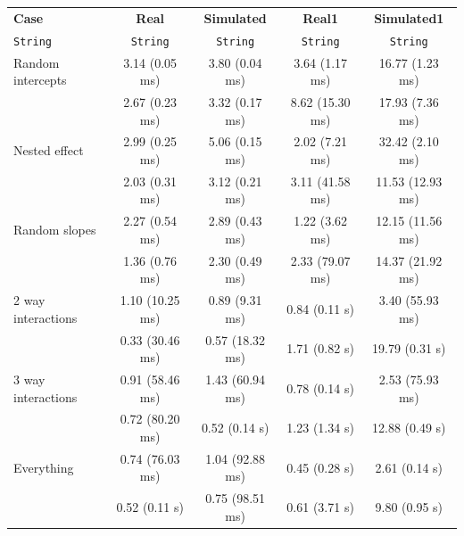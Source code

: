 \begin{tabular}{lcccc}
  \textbf{Case} & \textbf{Real} & \textbf{Simulated} & \textbf{Real1} & \textbf{Simulated1} \\
  \texttt{String} & \texttt{String} & \texttt{String} & \texttt{String} & \texttt{String} \\
  Random intercepts & 3.14 (0.05 ms) & 3.80 (0.04 ms) & 3.64 (1.17 ms) & 16.77 (1.23 ms) \\
   & 2.67 (0.23 ms) & 3.32 (0.17 ms) & 8.62 (15.30 ms) & 17.93 (7.36 ms) \\\hline
  Nested effect & 2.99 (0.25 ms) & 5.06 (0.15 ms) & 2.02 (7.21 ms) & 32.42 (2.10 ms) \\
   & 2.03 (0.31 ms) & 3.12 (0.21 ms) & 3.11 (41.58 ms) & 11.53 (12.93 ms) \\\hline
  Random slopes & 2.27 (0.54 ms) & 2.89 (0.43 ms) & 1.22 (3.62 ms) & 12.15 (11.56 ms) \\
   & 1.36 (0.76 ms) & 2.30 (0.49 ms) & 2.33 (79.07 ms) & 14.37 (21.92 ms) \\\hline
  2 way interactions & 1.10 (10.25 ms) & 0.89 (9.31 ms) & 0.84 (0.11 s) & 3.40 (55.93 ms) \\
   & 0.33 (30.46 ms) & 0.57 (18.32 ms) & 1.71 (0.82 s) & 19.79 (0.31 s) \\\hline
  3 way interactions & 0.91 (58.46 ms) & 1.43 (60.94 ms) & 0.78 (0.14 s) & 2.53 (75.93 ms) \\
   & 0.72 (80.20 ms) & 0.52 (0.14 s) & 1.23 (1.34 s) & 12.88 (0.49 s) \\\hline
  Everything & 0.74 (76.03 ms) & 1.04 (92.88 ms) & 0.45 (0.28 s) & 2.61 (0.14 s) \\
   & 0.52 (0.11 s) & 0.75 (98.51 ms) & 0.61 (3.71 s) & 9.80 (0.95 s) \\
\end{tabular}

